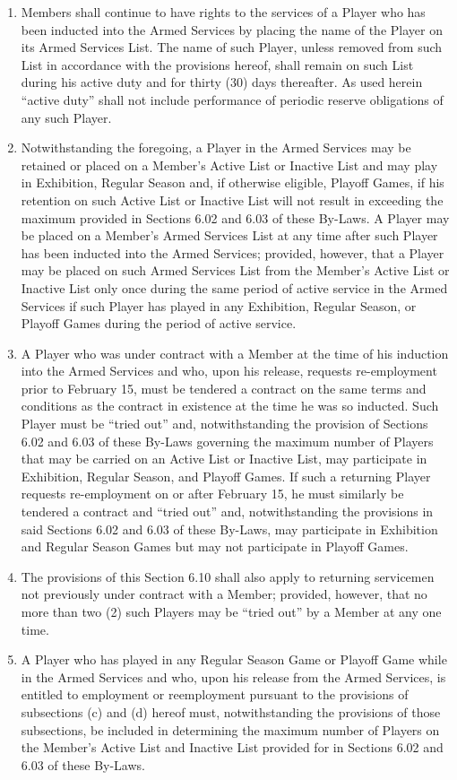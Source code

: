 \documentclass[]{book}
\providecommand{\tightlist}{%
  \setlength{\itemsep}{0pt}\setlength{\parskip}{0pt}}
\begin{document}
\begin{enumerate}
\def\labelenumi{(\alph{enumi})}
\tightlist
\item
  Members shall continue to have rights to the services of a Player who has been inducted into the Armed Services by placing the name of the Player on its Armed Services List. The name of such Player, unless removed from such List in accordance with the provisions hereof, shall remain on such List during his active duty and for thirty (30) days thereafter. As used herein ``active duty'' shall not include performance of periodic reserve obligations of any such Player.
\item
  Notwithstanding the foregoing, a Player in the Armed Services may be retained or placed on a Member's Active List or Inactive List and may play in Exhibition, Regular Season and, if otherwise eligible, Playoff Games, if his retention on such Active List or Inactive List will not result in exceeding the maximum provided in Sections 6.02 and 6.03 of these By-Laws. A Player may be placed on a Member's Armed Services List at any time after such Player has been inducted into the Armed Services; provided, however, that a Player may be placed on such Armed Services List from the Member's Active List or Inactive List only once during the same period of active service in the Armed Services if such Player has played in any Exhibition, Regular Season, or Playoff Games during the period of active service.
\item
  A Player who was under contract with a Member at the time of his induction into the Armed Services and who, upon his release, requests re-employment prior to February 15, must be tendered a contract on the same terms and conditions as the contract in existence at the time he was so inducted. Such Player must be ``tried out'' and, notwithstanding the provision of Sections 6.02 and 6.03 of these By-Laws governing the maximum number of Players that may be carried on an Active List or Inactive List, may participate in Exhibition, Regular Season, and Playoff Games. If such a returning Player requests re-employment on or after February 15, he must similarly be tendered a contract and ``tried out'' and, notwithstanding the provisions in said Sections 6.02 and 6.03 of these By-Laws, may participate in Exhibition and Regular Season Games but may not participate in Playoff Games.
\item
  The provisions of this Section 6.10 shall also apply to returning servicemen not previously under contract with a Member; provided, however, that no more than two (2) such Players may be ``tried out'' by a Member at any one time.
\item
  A Player who has played in any Regular Season Game or Playoff Game while in the Armed Services and who, upon his release from the Armed Services, is entitled to employment or reemployment pursuant to the provisions of subsections (c) and (d) hereof must, notwithstanding the provisions of those subsections, be included in determining the maximum number of Players on the Member's Active List and Inactive List provided for in Sections 6.02 and 6.03 of these By-Laws.
\end{enumerate}
\end{document}
